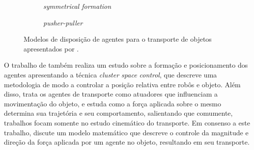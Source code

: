 \begin{figure}[htpb]
\begin{subfigure}[t]{0.3\textwidth}
    \caption{\emph{symmetrical formation}}
  \end{subfigure}
  \hspace{0.1cm}
  \begin{subfigure}[t]{0.3\textwidth}
    \centering
    \caption{\emph{pusher-puller}}
  \end{subfigure}

  \caption[Modelos de disposição de agentes para o transporte de objetos]{Modelos de disposição de agentes para o transporte de objetos apresentados por \cite{Eoh2011}.}
  \label{fig:eoh}
\end{figure}

O trabalho de \cite{Neumann2014} também realiza um estudo sobre a formação e posicionamento dos agentes apresentando a técnica \emph{cluster space control}, que descreve uma metodologia de modo a controlar a posição relativa entre robôs e objeto. Além disso, trata os agentes de transporte como atuadores que influenciam a movimentação do objeto, e estuda como a força aplicada sobre o mesmo determina sua trajetória e seu comportamento, salientando que comumente, trabalhos focam somente no estudo cinemático do transporte.
%
Em consenso a este trabalho, \cite{Behrens2010} discute um modelo matemático que descreve o controle da magnitude e direção da força aplicada por um agente no objeto, resultando em seu transporte.

